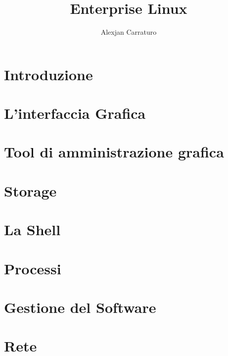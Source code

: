 \documentclass[a4paper,10pt]{article}
\title{Enterprise Linux}
\author{Alexjan Carraturo}
\begin{document}
\maketitle
\newpage

\section{Introduzione}


\newpage

\section{L'interfaccia Grafica}


\newpage

\section{Tool di amministrazione grafica}


\newpage

\section{Storage}


\newpage

\section{La Shell}


\newpage

\section{Processi}


\newpage

\section{Gestione del Software}


\newpage

\section{Rete}


\newpage
\end{document}
